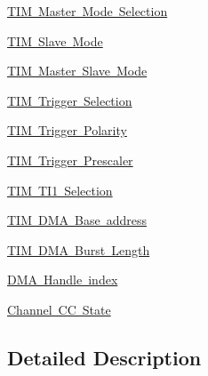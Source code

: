 \begin{DoxyCompactItemize}
\mbox{\hyperlink{group___t_i_m___master___mode___selection}{T\+I\+M Master Mode Selection}}
\item 
\mbox{\hyperlink{group___t_i_m___slave___mode}{T\+I\+M Slave Mode}}
\item 
\mbox{\hyperlink{group___t_i_m___master___slave___mode}{T\+I\+M Master Slave Mode}}
\item 
\mbox{\hyperlink{group___t_i_m___trigger___selection}{T\+I\+M Trigger Selection}}
\item 
\mbox{\hyperlink{group___t_i_m___trigger___polarity}{T\+I\+M Trigger Polarity}}
\item 
\mbox{\hyperlink{group___t_i_m___trigger___prescaler}{T\+I\+M Trigger Prescaler}}
\item 
\mbox{\hyperlink{group___t_i_m___t_i1___selection}{T\+I\+M T\+I1 Selection}}
\item 
\mbox{\hyperlink{group___t_i_m___d_m_a___base__address}{T\+I\+M D\+M\+A Base address}}
\item 
\mbox{\hyperlink{group___t_i_m___d_m_a___burst___length}{T\+I\+M D\+M\+A Burst Length}}
\item 
\mbox{\hyperlink{group___d_m_a___handle__index}{D\+M\+A Handle index}}
\item 
\mbox{\hyperlink{group___channel___c_c___state}{Channel C\+C State}}
\end{DoxyCompactItemize}


\subsection{Detailed Description}

